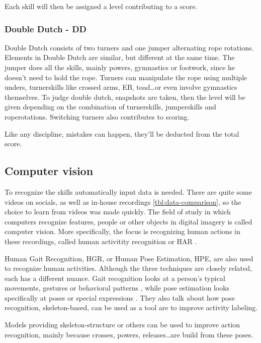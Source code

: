 Each skill will then be assigned a level contributing to a score. 

\subsubsection{Double Dutch - DD}
\label{subsubsec:double dutch}

Double Dutch consists of two turners and one jumper alternating rope rotations. Elements in Double Dutch are similar, but different at the same time. The jumper does all the skills, mainly powers, gymnastics or footwork, since he doesn't need to hold the rope. Turners can manipulate the rope using multiple unders, turnerskills like crossed arms, EB, toad\dots or even involve gymnastics themselves.
To judge double dutch, snapshots are taken, then the level will be given depending on the combination of turnerskills, jumperskills and roperotations.
Switching turners also contributes to scoring.

Like any discipline, mistakes can happen, they'll be deducted from the total score.

\subsection{Computer vision}
\label{subsec:computer vision}

To recognize the skills automatically input data is needed. There are quite some videos on socials, as well as in-house recordings \ref{tbl:data-comparison}, so the choice to learn from videos was made quickly. The field of study in which computers recognize features, people or other objects in digital imagery is called computer vision. More specifically, the focus is recognizing human actions in these recordings, called human activitity recognition or HAR \autocite{Pareek_2020}.

Human Gait Recognition, HGR, or Human Pose Estimation, HPE, are also used to recognize human activities. Although the three techniques are closely related, each has a different nuance. Gait recognition looks at a person's typical movements, gestures or behavioral patterns \autocite{Alharthi_2019}, while pose estimation looks specifically at poses or special expressions \autocite{Song_2021}. They also talk about how pose recognition, skeleton-based, can be used as a tool are to improve activity labeling.

Models providing skeleton-structure or others can be used to improve action recognition, mainly because crosses, powers, releases\dots are build from these poses.


